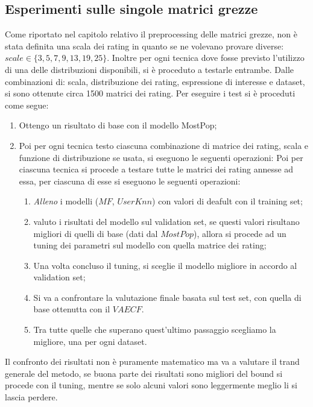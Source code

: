 \subsection{Esperimenti sulle singole matrici grezze}
Come riportato nel capitolo relativo il preprocessing delle matrici grezze, non è stata definita una scala dei rating in quanto se ne volevano provare diverse: $scale \in \{3, 5, 7, 9, 13, 19, 25\}$.
Inoltre per ogni tecnica dove fosse previsto l'utilizzo di una delle distribuzioni disponibili, si è proceduto a testarle entrambe.
Dalle combinazioni di: scala, distribuzione dei rating, espressione di interesse e dataset, si sono ottenute circa 1500 matrici dei rating.
Per eseguire i test si è proceduti come segue:
\begin{enumerate}
    \item Ottengo un risultato di base con il modello MostPop;
    \item Poi per ogni tecnica testo ciascuna combinazione di matrice dei rating, scala e funzione di distribuzione se usata, si eseguono le seguenti operazioni:
    Poi per ciascuna tecnica si procede a testare tutte le matrici dei rating annesse ad essa, per ciascuna di esse si eseguono le seguenti operazioni:
    \begin{enumerate}
        \item \textit{Alleno} i modelli ($MF$, $UserKnn$) con valori di deafult con il training set;
        \item valuto i risultati del modello sul validation set, se questi valori risultano migliori di quelli di base (dati dal $MostPop$), allora si procede ad un tuning dei parametri sul modello con quella matrice dei rating;
        \item Una volta concluso il tuning, si sceglie il modello migliore in accordo al validation set;
        \item Si va a confrontare la valutazione finale basata sul test set, con quella di base ottenutta con il $VAECF$.
        \item Tra tutte quelle che superano quest'ultimo passaggio scegliamo la migliore, una per ogni dataset.
    \end{enumerate}
\end{enumerate}

Il confronto dei risultati non è puramente matematico ma va a valutare il trand generale del metodo, se buona parte dei risultati sono migliori del bound si procede con il tuning, mentre se solo alcuni valori sono leggermente meglio li si lascia perdere.

